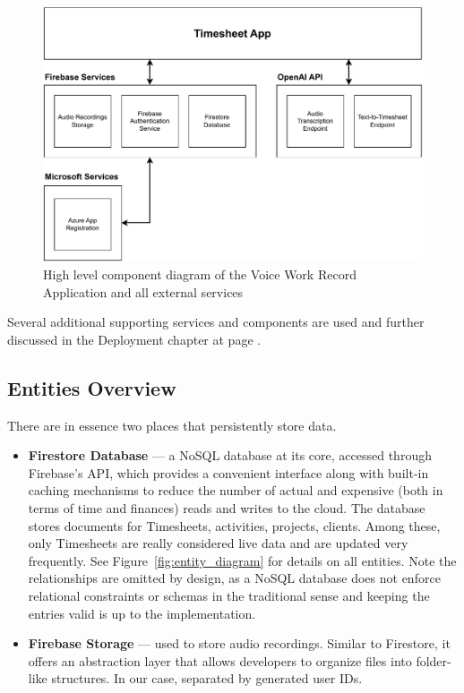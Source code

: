 \documentclass[
  digital,     %
  oneside,     %
  nosansbold,  %
  nocolorbold, %
  lof,         %
  lot,         %
]{fithesis4}
\begin{document}
\begin{figure}[ht]
    \centering
    \includegraphics[width=\textwidth]{assets/diagrams/timesheet_app_component_diagram.drawio.pdf}
    \caption{High level component diagram of the Voice Work Record Application and all external services}
    \label{fig:timesheet_app_architecture}
\end{figure}

Several additional supporting services and components are used and further discussed in the Deployment chapter at page \pageref{chap:deployment}.

\subsection{Entities Overview}

There are in essence two places that persistently store data.

\begin{itemize}
    \item \textbf{Firestore Database} --- a \acrshort{NoSQL} database at its core, accessed through Firebase's \gls{API}, which provides a convenient interface along with built-in caching mechanisms to reduce the number of actual and expensive (both in terms of time and finances) reads and writes to the cloud. The database stores documents for Timesheets, activities, projects, clients. Among these, only Timesheets are really considered live data and are updated very frequently. See Figure~\ref{fig:entity_diagram} for details on all entities. Note the relationships are omitted by design, as a \acrshort{NoSQL} database does not enforce relational constraints or schemas in the traditional sense and keeping the entries valid is up to the implementation.
    \item \textbf{Firebase Storage} --- used to store audio recordings. Similar to Firestore, it offers an abstraction layer that allows developers to organize files into folder-like structures. In our case, separated by generated user IDs.
\end{itemize}
\end{document}
